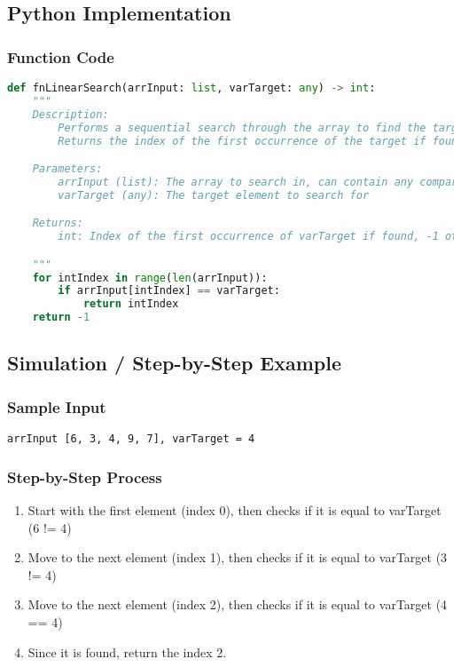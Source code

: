 \documentclass{article}
\begin{document}
\subsection*{Python Implementation}
\subsubsection*{Function Code}
\begin{lstlisting}[language=Python]
def fnLinearSearch(arrInput: list, varTarget: any) -> int:
    """
    Description:
        Performs a sequential search through the array to find the target element.
        Returns the index of the first occurrence of the target if found.

    Parameters:
        arrInput (list): The array to search in, can contain any comparable type
        varTarget (any): The target element to search for

    Returns:
        int: Index of the first occurrence of varTarget if found, -1 otherwise

    """
    for intIndex in range(len(arrInput)):
        if arrInput[intIndex] == varTarget:
            return intIndex
    return -1
\end{lstlisting}

\subsection*{Simulation / Step-by-Step Example}
\subsubsection*{Sample Input}
\texttt{arrInput [6, 3, 4, 9, 7], varTarget = 4}

\subsubsection*{Step-by-Step Process}
\begin{enumerate}
    \item Start with the first element (index 0), then checks if it is equal to varTarget (6 != 4)
    \item Move to the next element (index 1), then checks if it is equal to varTarget (3 != 4)
    \item Move to the next element (index 2), then checks if it is equal to varTarget (4 == 4)
    \item Since it is found, return the index 2.
\end{enumerate}
\end{document}
